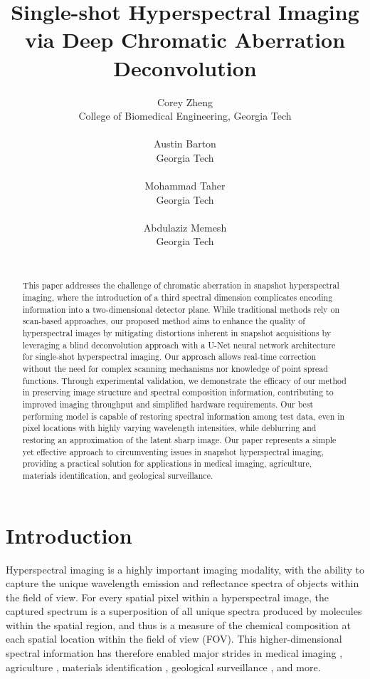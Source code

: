 \documentclass{article}
\title{Single-shot Hyperspectral Imaging via Deep Chromatic Aberration Deconvolution}
\author{%
   Corey Zheng \\
   College of Biomedical Engineering, Georgia Tech  \\
   \text{czheng@gatech.edu} \\
   \AND
   Austin Barton \\
   Georgia Tech \\
   \text{abarton40@gatech.edu} \\
   \And
   Mohammad Taher \\
   Georgia Tech \\
   \text{mtaher3@gatech.edu} \\
   \And
   Abdulaziz Memesh \\
   Georgia Tech \\
   \text{a.memesh@gatech.edu} \\
}
\begin{document}
\maketitle


\begin{abstract}
  This paper addresses the challenge of chromatic aberration in snapshot hyperspectral imaging, where the introduction of a third spectral dimension complicates encoding information into a two-dimensional detector plane. While traditional methods rely on scan-based approaches, our proposed method aims to enhance the quality of hyperspectral images by mitigating distortions inherent in snapshot acquisitions by leveraging a blind deconvolution approach with a U-Net neural network architecture for single-shot hyperspectral imaging. Our approach allows real-time correction without the need for complex scanning mechanisms nor knowledge of point spread functions. Through experimental validation, we demonstrate the efficacy of our method in preserving image structure and spectral composition information, contributing to improved imaging throughput and simplified hardware requirements. Our best performing model is capable of restoring spectral information among test data, even in pixel locations with highly varying wavelength intensities, while deblurring and restoring an approximation of the latent sharp image. Our paper represents a simple yet effective approach to circumventing issues in snapshot hyperspectral imaging, providing a practical solution for applications in medical imaging, agriculture, materials identification, and geological surveillance.
\end{abstract}


\section{Introduction}
Hyperspectral imaging is a highly important imaging modality, with the ability to capture the unique wavelength emission and reflectance spectra of objects within the field of view. For every spatial pixel within a hyperspectral image, the captured spectrum is a superposition of all unique spectra produced by molecules within the spatial region, and thus is a measure of the chemical composition at each spatial location within the field of view (FOV). This higher-dimensional spectral information has therefore enabled major strides in medical imaging \cite{lu2014medical}, agriculture \cite{lu2020recent}, materials identification \cite{dong2019review}, geological surveillance \cite{peyghambari2021hyperspectral}, and more.  
\end{document}
